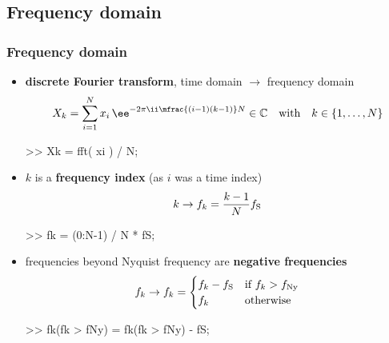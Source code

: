 
\subsection{Frequency domain}

\begin{frame}[fragile] %
	\frametitle{Frequency domain}
	\begin{itemize}
		\item \textbf{discrete Fourier transform}, time domain $\rightarrow$ frequency domain
			\begin{align*}
				X_k=\sum_{i=1}^Nx_i\,\ee^{-2\pi\ii\mfrac{(i-1)(k-1)}N}\in\mathbb C\quad\textrm{with}\quad k\in\{1,\ldots,N\}
			\end{align*}
			\begin{code}
>> Xk = fft( xi ) / N; \color{medium}%
			\end{code}
		\item $k$ is a \textbf{frequency index} (as $i$ was a time index)
			\begin{align*}
				k\rightarrow f_k=\frac{k-1}Nf_{\textrm S}
			\end{align*}
			\begin{code}
>> fk = (0:N-1) / N * fS; \color{medium}%
			\end{code}
		\item frequencies beyond Nyquist frequency are \textbf{negative frequencies}
			\begin{align*}
				f_k\rightarrow f_k=\begin{cases}f_k-f_{\textrm S}&\textrm{if $f_k>f_{\textrm{Ny}}$}\\f_k&\textrm{otherwise}\end{cases}
			\end{align*}
			\begin{code}
>> fk(fk > fNy) = fk(fk > fNy) - fS; \color{medium}%
			\end{code}
	\end{itemize}
\end{frame}

